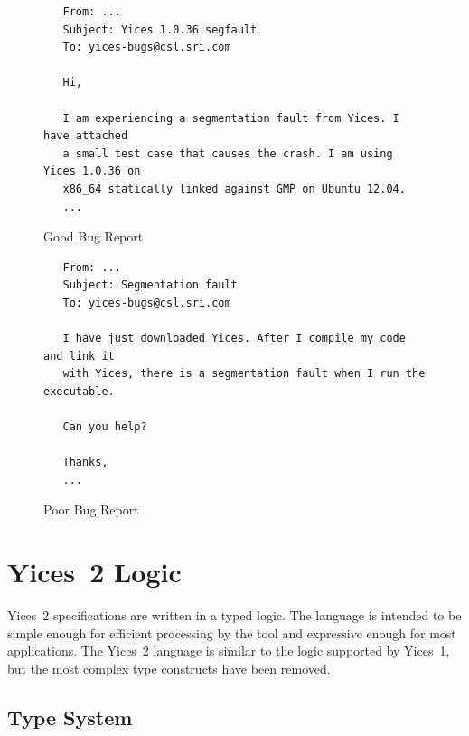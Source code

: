 \documentclass[11pt,twoside,fleqn,openright,titlepage]{cslreport}
\begin{document}
\begin{figure}
\begin{center}
\begin{footnotesize}
\begin{verbatim}
   From: ...
   Subject: Yices 1.0.36 segfault
   To: yices-bugs@csl.sri.com

   Hi,

   I am experiencing a segmentation fault from Yices. I have attached
   a small test case that causes the crash. I am using Yices 1.0.36 on
   x86_64 statically linked against GMP on Ubuntu 12.04.
   ...
\end{verbatim}
\end{footnotesize}
\end{center}
\caption{Good Bug Report}
\label{good-report}
\end{figure}

\begin{figure}
\begin{center}
\begin{footnotesize}
\begin{verbatim}
   From: ...
   Subject: Segmentation fault
   To: yices-bugs@csl.sri.com

   I have just downloaded Yices. After I compile my code and link it
   with Yices, there is a segmentation fault when I run the executable.

   Can you help?

   Thanks,
   ...
\end{verbatim}
\end{footnotesize}
\end{center}
\caption{Poor Bug Report}
\label{bad-report}
\end{figure}





\chapter{Yices~2 Logic}
\label{language}

Yices~2 specifications are  written in a typed logic.  The language is
intended to be simple enough  for efficient processing by the tool and
expressive  enough  for most  applications.  The  Yices~2 language  is
similar to the  logic supported by Yices~1, but  the most complex type
constructs have been removed.


\section{Type System}
\label{type-system}
\end{document}
